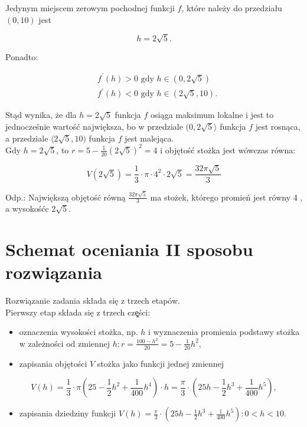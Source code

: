 \documentclass[10pt]{article}
\begin{document}
Jedynym miejscem zerowym pochodnej funkcji $f$, które należy do przedziału $(0,10)$ jest

$$
h=2 \sqrt{5} .
$$

Ponadto:

$$
\begin{aligned}
& f^{\prime}(h)>0 \text { gdy } h \in(0,2 \sqrt{5}) \\
& f^{\prime}(h)<0 \text { gdy } h \in(2 \sqrt{5}, 10) .
\end{aligned}
$$

Stąd wynika, że dla $h=2 \sqrt{5}$ funkcja $f$ osiąga maksimum lokalne i jest to jednocześnie wartość największa, bo w przedziale $(0,2 \sqrt{5}\rangle$ funkcja $f$ jest rosnąca, a przedziale $\langle 2 \sqrt{5}, 10)$ funkcja $f$ jest malejąca.\\
Gdy $h=2 \sqrt{5}$, to $r=5-\frac{1}{20}(2 \sqrt{5})^{2}=4$ i objętość stożka jest wówczas równa:

$$
V(2 \sqrt{5})=\frac{1}{3} \cdot \pi \cdot 4^{2} \cdot 2 \sqrt{5}=\frac{32 \pi \sqrt{5}}{3}
$$

Odp.: Największą objętość równą $\frac{32 \pi \sqrt{5}}{3}$ ma stożek, którego promień jest równy 4 , a wysokośćc $2 \sqrt{5}$.

\section*{Schemat oceniania II sposobu rozwiązania}
Rozwiązanie zadania składa się z trzech etapów.\\
Pierwszy etap składa się z trzech czę̨ści:

\begin{itemize}
  \item oznaczenia wysokości stożka, np. $h$ i wyznaczenia promienia podstawy stożka w zależności od zmiennej $h: r=\frac{100-h^{2}}{20}=5-\frac{1}{20} h^{2}$,
  \item zapisania objętości $V$ stożka jako funkcji jednej zmiennej
\end{itemize}

$$
V(h)=\frac{1}{3} \cdot \pi\left(25-\frac{1}{2} h^{2}+\frac{1}{400} h^{4}\right) \cdot h=\frac{\pi}{3} \cdot\left(25 h-\frac{1}{2} h^{3}+\frac{1}{400} h^{5}\right),
$$

\begin{itemize}
  \item zapisania dziedziny funkcji $V(h)=\frac{\pi}{3} \cdot\left(25 h-\frac{1}{2} h^{3}+\frac{1}{400} h^{5}\right): 0<h<10$.
\end{itemize}
\end{document}
